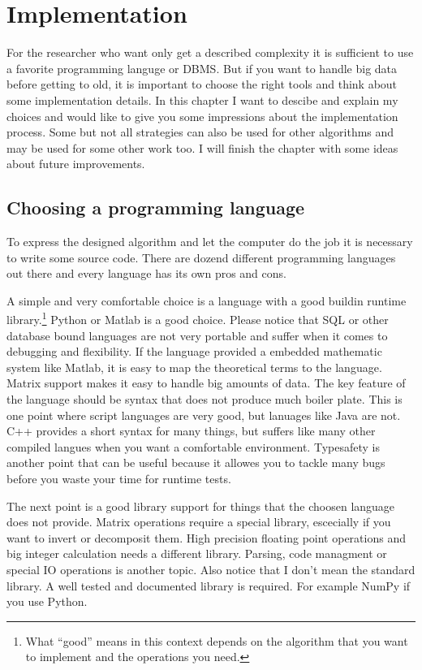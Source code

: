 \chapter{Implementation}
For the researcher who want only get a described complexity it is sufficient to use a favorite programming languge or DBMS. But if you want to handle big data before getting to old, it is important to choose the right tools and think about some implementation details. In this chapter I want to descibe and explain my choices and would like to give you some impressions about the implementation process. Some but not all strategies can also be used for other algorithms and may be used for some other work too. I will finish the chapter with some ideas about future improvements.

\section{Choosing a programming language}
To express the designed algorithm and let the computer do the job it is necessary to write some source code. There are dozend different programming languages out there and every language has its own pros and cons.

A simple and very comfortable choice is a language with a good buildin runtime library.\footnote{What ``good'' means in this context depends on the algorithm that you want to implement and the operations you need.} Python or Matlab is a good choice. Please notice that SQL or other database bound languages are not very portable and suffer when it comes to debugging and flexibility. If the language provided a embedded mathematic system like Matlab, it is easy to map the theoretical terms to the language. Matrix support makes it easy to handle big amounts of data. The key feature of the language should be syntax that does not produce much boiler plate. This is one point where script languages are very good, but lanuages like Java are not. C++ provides a short syntax for many things, but suffers like many other compiled langues when you want a comfortable environment. Typesafety is another point that can be useful because it allowes you to tackle many bugs before you waste your time for runtime tests.

The next point is a good library support for things that the choosen language does not provide. Matrix operations require a special library, escecially if you want to invert or decomposit them. High precision floating point operations and big integer calculation needs a different library. Parsing, code managment or special IO operations is another topic. Also notice that I don't mean the standard library. A well tested and documented library is required. For example NumPy if you use Python.

